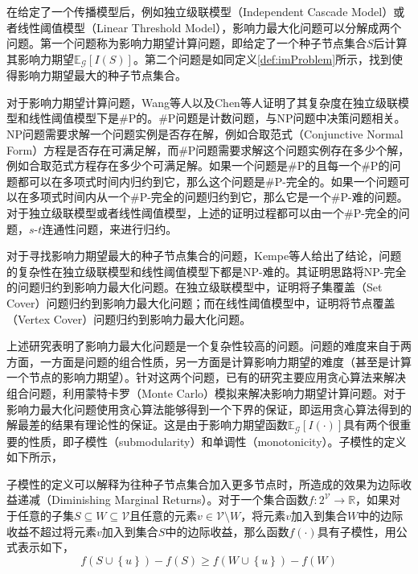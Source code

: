 在给定了一个传播模型后，例如独立级联模型（Independent Cascade Model）或者线性阈值模型（Linear Threshold Model），影响力最大化问题可以分解成两个问题。第一个问题称为影响力期望计算问题，即给定了一个种子节点集合$S$后计算其影响力期望$\mathbb{E}_\mathcal{G}\left[I\left(S\right)\right]$。第二个问题是如同定义\ref{def:imProblem}所示，找到使得影响力期望最大的种子节点集合。

对于影响力期望计算问题，Wang等人以及Chen等人证明了其复杂度在独立级联模型和线性阈值模型下是\#P的。\#P问题是计数问题，与NP问题中决策问题相关。NP问题需要求解一个问题实例是否存在解，例如合取范式（Conjunctive Normal Form）方程是否存在可满足解，而\#P问题需要求解这个问题实例存在多少个解，例如合取范式方程存在多少个可满足解。如果一个问题是\#P的且每一个\#P的问题都可以在多项式时间内归约到它，那么这个问题是\#P-完全的。如果一个问题可以在多项式时间内从一个\#P-完全的问题归约到它，那么它是一个\#P-难的问题。对于独立级联模型或者线性阈值模型，上述的证明过程都可以由一个\#P-完全的问题，$s$-$t$连通性问题，来进行归约。

对于寻找影响力期望最大的种子节点集合的问题，Kempe等人给出了结论，问题的复杂性在独立级联模型和线性阈值模型下都是NP-难的。其证明思路将NP-完全的问题归约到影响力最大化问题。在独立级联模型中，证明将子集覆盖（Set Cover）问题归约到影响力最大化问题；而在线性阈值模型中，证明将节点覆盖（Vertex Cover）问题归约到影响力最大化问题。

上述研究表明了影响力最大化问题是一个复杂性较高的问题。问题的难度来自于两方面，一方面是问题的组合性质，另一方面是计算影响力期望的难度（甚至是计算一个节点的影响力期望）。针对这两个问题，已有的研究主要应用贪心算法来解决组合问题，利用蒙特卡罗（Monte Carlo）模拟来解决影响力期望计算问题。对于影响力最大化问题使用贪心算法能够得到一个下界的保证，即运用贪心算法得到的解最差的结果有理论性的保证。这是由于影响力期望函数$\mathbb{E}_\mathcal{G}\left[I\left(\cdot\right)\right]$具有两个很重要的性质，即子模性（submodularity）和单调性（monotonicity）。子模性的定义如下所示，
\begin{defn}[子模性]
\label{def:submodularity}
子模性的定义可以解释为往种子节点集合加入更多节点时，所造成的效果为边际收益递减（Diminishing Marginal Returns）。对于一个集合函数$f:2^{\mathcal{V}} \rightarrow \mathbb{R}$，如果对于任意的子集$S \subseteq W \subseteq \mathcal{V}$且任意的元素$v \in \mathcal{V} \setminus W$，将元素$v$加入到集合$W$中的边际收益不超过将元素$v$加入到集合$S$中的边际收益，那么函数$f\left( \cdot \right)$具有子模性，用公式表示如下，
\begin{equation}
\label{eq:submodularity}
	f\left(S\cup\left\{u\right\}\right) - f\left(S\right) \geq f\left(W\cup\left\{u\right\}\right) - f\left(W\right)
\end{equation}
\end{defn}

